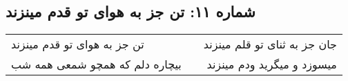 \begin{center}
\section*{شماره ۱۱: تن جز به هوای تو قدم مینزند}
\label{sec:011}
\begin{longtable}{l p{0.5cm} r}
تن جز به هوای تو قدم مینزند
&&
جان جز به ثنای تو قلم مینزند
\\
بیچاره دلم که همچو شمعی همه شب
&&
میسوزد و میگرید ودم مینزند
\\
\end{longtable}
\end{center}
